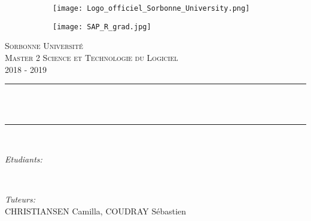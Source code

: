 \begin{titlepage}
	\centering
    \vspace*{0.5 cm}
    \begin{figure}
        \begin{subfigure}{0.3\textwidth}
        \flushleft
            \texttt{[image: Logo\_officiel\_Sorbonne\_University.png]}
        \end{subfigure}
        \hspace{.4\textwidth}
        \begin{subfigure}{0.3\textwidth}
            \texttt{[image: SAP\_R\_grad.jpg]}
        \end{subfigure}
    \end{figure}
    \textsc{\LARGE Sorbonne Université}\\[2.0 cm]	%
	\textsc{\Large Master 2 Science et Technologie du Logiciel\\2018 - 2019}\\[0.5 cm]		%
	\rule{\linewidth}{0.8 mm} \\[0.6 cm]
	{ \huge \bfseries \thetitle}\\[0.6 cm]
	\rule{\linewidth}{0.8 mm} \\[2.6 cm]

	\begin{minipage}{0.4\textwidth}
		\begin{flushleft} \large
			\emph{Etudiants:}\\
			\theauthor
			\end{flushleft}
			\end{minipage}~
			\begin{minipage}{0.4\textwidth}
			\begin{flushright} \large
			\emph{Tuteurs:} \\
			CHRISTIANSEN Camilla, COUDRAY Sébastien %
		\end{flushright}
	\end{minipage}\\[1.6 cm]
	 
	{\large \thedate}\\[2 cm]
 
	\vfill
	
\end{titlepage}